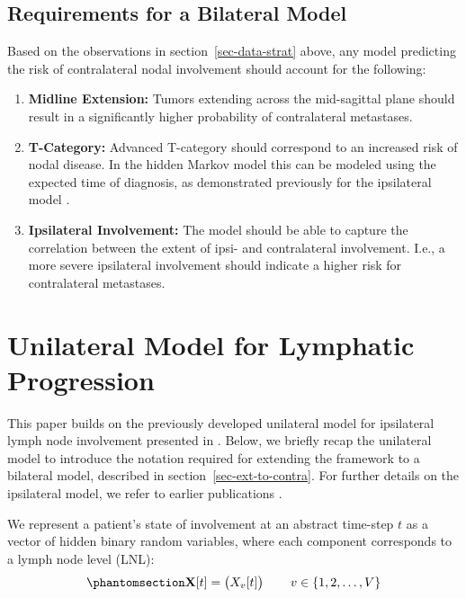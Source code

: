 \documentclass[
  sn-mathphys-num,
]{sn-jnl}
\providecommand{\tightlist}{%
  \setlength{\itemsep}{0pt}\setlength{\parskip}{0pt}}\usepackage{longtable,booktabs,array}
\begin{document}
\subsection{Requirements for a Bilateral Model}\label{sec-requirements}

Based on the observations in section~\ref{sec-data-strat} above, any
model predicting the risk of contralateral nodal involvement should
account for the following:

\begin{enumerate}
\def\labelenumi{\arabic{enumi}.}
\tightlist
\item
  \textbf{Midline Extension:} Tumors extending across the mid-sagittal
  plane should result in a significantly higher probability of
  contralateral metastases.
\item
  \textbf{T-Category:} Advanced T-category should correspond to an
  increased risk of nodal disease. In the hidden Markov model this can
  be modeled using the expected time of diagnosis, as demonstrated
  previously for the ipsilateral model \citep{ludwig_hidden_2021}.
\item
  \textbf{Ipsilateral Involvement:} The model should be able to capture
  the correlation between the extent of ipsi- and contralateral
  involvement. I.e., a more severe ipsilateral involvement should
  indicate a higher risk for contralateral metastases.
\end{enumerate}

\section{Unilateral Model for Lymphatic
Progression}\label{sec-unilateral}

This paper builds on the previously developed unilateral model for
ipsilateral lymph node involvement presented in
\citep{ludwig_modelling_2024}. Below, we briefly recap the unilateral
model to introduce the notation required for extending the framework to
a bilateral model, described in section~\ref{sec-ext-to-contra}. For
further details on the ipsilateral model, we refer to earlier
publications \citep{ludwig_hidden_2021, ludwig_modelling_2024}.

We represent a patient's state of involvement at an abstract time-step
\(t\) as a vector of hidden binary random variables, where each
component corresponds to a lymph node level (LNL):
%
\begin{equation}\phantomsection\label{eq-state-def}{
\mathbf{X}[t] = \begin{pmatrix} X_v[t] \end{pmatrix} \qquad v \in \left\{ 1, 2, \ldots, V \right\}
}\end{equation}
\end{document}
